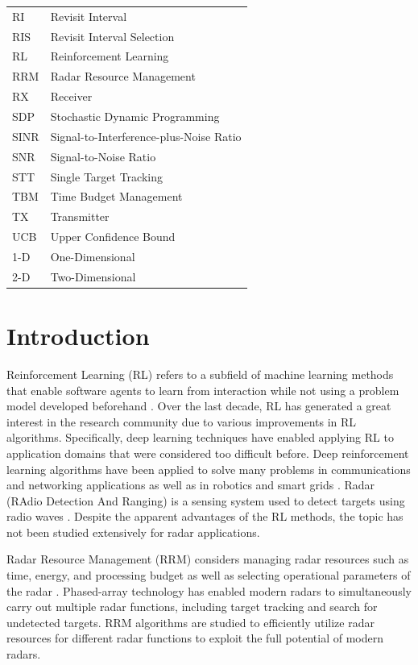 \documentclass[english, 12pt, a4paper, elec, utf8, a-1b, online]{aaltothesis}
\numberwithin{equation}{section}
\begin{document}
\begin{tabular}{ll}
RI  & Revisit Interval \\
RIS & Revisit Interval Selection \\
RL & Reinforcement Learning \\
RRM & Radar Resource Management \\
RX & Receiver \\
SDP  & Stochastic Dynamic Programming \\
SINR  & Signal-to-Interference-plus-Noise Ratio \\
SNR & Signal-to-Noise Ratio \\
STT & Single Target Tracking \\
TBM & Time Budget Management \\
TX & Transmitter \\
UCB & Upper Confidence Bound \\
1-D & One-Dimensional \\
2-D & Two-Dimensional \\
\end{tabular}


\cleardoublepage
{}
\section{Introduction}
\setcounter{page}{1}

Reinforcement Learning (RL) refers to a subfield of machine learning methods that enable software agents to learn from interaction while not using a problem model developed beforehand \cite{Sutton2018}. 
Over the last decade, RL has generated a great interest in the research community due to various improvements in RL algorithms.
Specifically, deep learning techniques have enabled applying RL to application domains that were considered too difficult before. 
Deep reinforcement learning algorithms have been applied to solve many problems in communications and networking applications \cite{Luong2018} as well as in robotics \cite{Kober2013} and smart grids \cite{Zhang2018}.
Radar (RAdio Detection And Ranging) is a sensing system used to detect targets using radio waves \cite{Curry2011}.
Despite the apparent advantages of the RL methods, the topic has not been studied extensively for radar applications.


Radar Resource Management (RRM) considers managing radar resources such as time, energy, and processing budget as well as selecting operational parameters of the radar \cite{Moo2016}.
Phased-array technology has enabled modern radars to simultaneously carry out multiple radar functions, including target tracking and search for undetected targets.
RRM algorithms are studied to efficiently utilize radar resources for different radar functions to exploit the full potential of modern radars.
\end{document}

